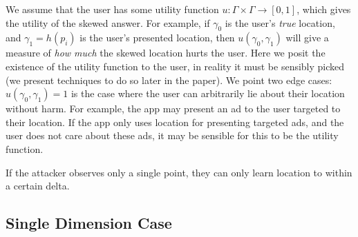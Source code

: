 \documentclass{article}
\begin{document}
We assume that the user has some utility function $u : \Gamma \times
\Gamma \rightarrow [0,1]$, which gives the utility of the skewed
answer.  For example, if $\gamma_0$ is the user's \emph{true}
location, and $\gamma_1 = h(p_i)$ is the user's presented location,
then $u(\gamma_0,\gamma_1)$ will give a measure of \emph{how much} the
skewed location hurts the user.  Here we posit the existence of the
utility function to the user, in reality it must be sensibly picked
(we present techniques to do so later in the paper).  We point two
edge cases: $u(\gamma_0,\gamma_1) = 1$ is the case where the user can
arbitrarily lie about their location without harm.  For example, the
app may present an ad to the user targeted to their location.  If the
app only uses location for presenting targeted ads, and the user does
not care about these ads, it may be sensible for this to be the
utility function.  

\newtheorem{noinformation}{Best case scenario for single poll} 

If the attacker observes only a single point, they can only learn
location to within a certain delta.

\subsection{Single Dimension Case}
\end{document}
